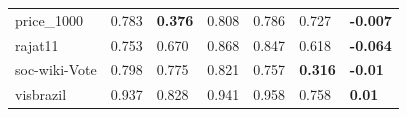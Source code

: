 \begin{table}[ht]
{\begin{tabular}{lllllll}
price\_1000   & 0.783                 & \textbf{0.376} & 0.808 & 0.786 & 0.727          & \textbf{-0.007} \\
rajat11       & 0.753                 & 0.670          & 0.868 & 0.847 & 0.618          & \textbf{-0.064} \\
soc-wiki-Vote & 0.798                 & 0.775          & 0.821 & 0.757 & \textbf{0.316} & \textbf{-0.01}  \\
visbrazil     & 0.937                 & 0.828          & 0.941 & 0.958 & 0.758          & \textbf{0.01}   \\ \hline
\end{tabular}}
\end{table}




